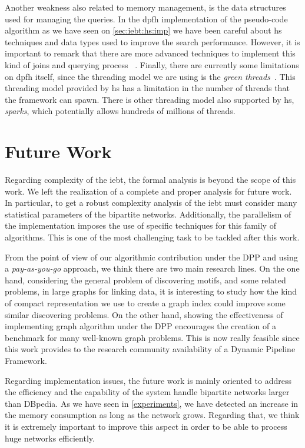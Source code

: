 Another weakness also related to memory management, is the data structures used for managing the queries. In the \acrshort{dpfh} implementation of the pseudo-code algorithm as we have seen on \autoref{sec:iebt:hs:imp} we have been careful about \acrshort{hs} techniques and data types used to improve the search performance. However, it is important to remark that there are more advanced techniques to implement this kind of joins and querying process ~\cite{Lai}.
Finally, there are currently some limitations on \acrlong{dpfh} itself, since the threading model we are using is the \textit{green threads}~\cite{sparks}. This  threading model provided by  \acrshort{hs} has a limitation in the number of threads that the framework can spawn. There is other threading model also supported by \acrshort{hs}, \textit{sparks},  which potentially allows hundreds of millions of threads.

\section{Future Work}

Regarding complexity of the \acrshort{iebt}, the formal analysis is beyond the scope of this work.  We left the realization of a complete  and  proper analysis for future work. In particular, to get a robust  complexity analysis of the \acrshort{iebt} must consider many statistical parameters of the bipartite networks. Additionally,  the parallelism of the implementation imposes the use of specific techniques for this family of algorithms. This is one of the most challenging task to be tackled after this work.

From the point of view of our algorithmic contribution  under the DPP and using a \textit{pay-as-you-go} approach, we think there are two main research lines. On the one hand,  considering  the general problem of discovering motifs,  and some related problems, in large graphs for linking data, it is interesting to study how the  kind of compact representation we use to create a graph index could improve some similar discovering problems. On the other hand, showing the effectiveness of implementing graph algorithm under the DPP encourages the creation of a benchmark  for many well-known graph problems. This is now really feasible since this work  provides to the research community  availability of a Dynamic Pipeline Framework. 


 Regarding implementation issues, the future work is mainly oriented to address the efficiency and the capability of the system handle bipartite networks  larger than DBpedia. As we have seen in \autoref{experiments}, we have detected an increase in the memory consumption as long as the network grows. 
Regarding that, we think it is extremely important to improve this aspect in order to be able to process huge networks efficiently. 

